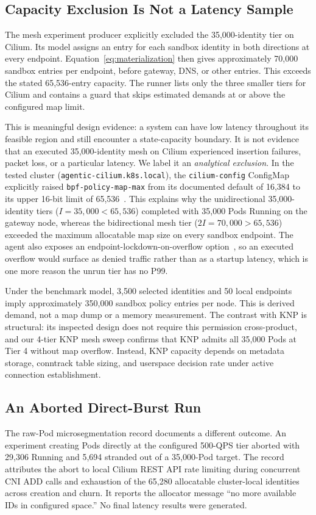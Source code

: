 \documentclass[letterpaper,twocolumn,10pt]{article}
\newcommand{\sys}{\textsc{KNP}}
\begin{document}
\subsection{Capacity Exclusion Is Not a Latency Sample}
The mesh experiment producer explicitly excluded the 35,000-identity
tier on Cilium. Its model assigns an entry for each sandbox identity in both
directions at every endpoint. Equation~\ref{eq:materialization} then
gives approximately 70,000 sandbox entries per endpoint, before gateway,
DNS, or other entries. This exceeds the stated 65,536-entry capacity.
The runner lists only the three smaller tiers for Cilium and contains a guard
that skips estimated demands at or above the configured map limit.

This is meaningful design evidence: a system can have low latency
throughout its feasible region and still encounter a state-capacity
boundary. It is not evidence that an executed 35,000-identity mesh on Cilium
experienced insertion failures, packet loss, or a particular latency.
We label it an \emph{analytical exclusion}. In the tested cluster
(\texttt{agentic-cilium.k8s.local}), the \texttt{cilium-config} ConfigMap
explicitly raised \texttt{bpf-policy-map-max} from its documented default
of 16,384 to its upper 16-bit limit of 65,536~\cite{ciliumagentref}.
This explains why the unidirectional 35,000-identity tiers ($I=35{,}000 < 65{,}536$)
completed with 35,000 Pods Running on the gateway node, whereas the
bidirectional mesh tier ($2I=70{,}000 > 65{,}536$) exceeded the maximum
allocatable map size on every sandbox endpoint. The agent also exposes an
endpoint-lockdown-on-overflow option~\cite{ciliumagentref}, so an
executed overflow would surface as denied traffic rather than as a
startup latency, which is one more reason the unrun tier has no P99.

Under the benchmark model, 3,500 selected identities and 50 local
endpoints imply approximately 350,000 sandbox policy entries per node.
This is derived demand, not a map dump or a memory measurement.
The contrast with \sys{} is structural: its inspected design does not
require this permission cross-product, and our 4-tier \sys{} mesh sweep
confirms that \sys{} admits all 35,000 Pods at Tier 4 without map overflow.
Instead, \sys{} capacity depends on metadata storage, conntrack table sizing,
and userspace decision rate under active connection establishment.

\subsection{An Aborted Direct-Burst Run}
The raw-Pod microsegmentation record documents a different outcome.
An experiment creating Pods directly at the configured 500-QPS tier
aborted with 29,306 Running and 5,694 stranded out of a 35,000-Pod
target. The record attributes the abort to local Cilium REST API
rate limiting during concurrent CNI ADD calls and exhaustion of the
65,280 allocatable cluster-local identities across creation and churn.
It reports the allocator message ``no more available IDs in configured
space.'' No final latency results were generated.
\end{document}
